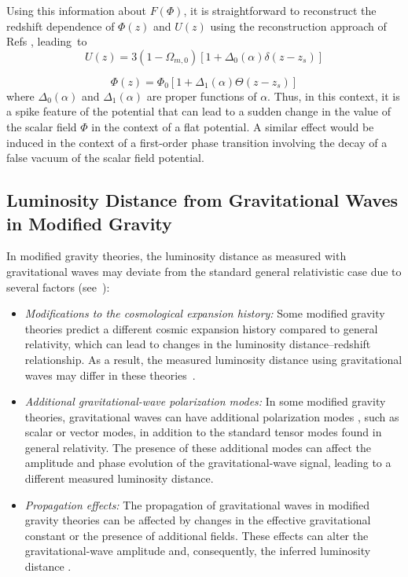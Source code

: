 \documentclass[universe,article,accept,moreauthors,pdftex]{Definitions/mdpi}
\begin{document}
Using this information about $F(\Phi)$, it is straightforward to reconstruct the redshift dependence of $\Phi(z)$ and $U(z)$ using the reconstruction approach of Refs \cite{Esposito-Farese:2000pbo,Boisseau:2000pr,Perivolaropoulos:2005yv}, leading~to 
\begin{equation}\label{equat2}
U(z)=3(1-\Omega_{m,0})[1+\Delta_{0}(\alpha)\delta(z-z_s)]
\end{equation}

\begin{equation}\label{equat4}
\Phi(z)=\Phi_{0}[1+\Delta_{1}(\alpha) \Theta(z-z_{s})]
\end{equation}
where $\Delta_{0}(\alpha)$ and $\Delta_{1}(\alpha)$ are proper functions of $\alpha$. Thus, in this context, it is a spike feature of the potential that can lead to a sudden change in the value of the scalar field $\Phi$ in the context of a flat potential. A similar effect would be induced in the context of a first-order phase transition involving the decay of a false vacuum of the scalar field potential.

\subsection{Luminosity Distance from Gravitational Waves in Modified Gravity}


In modified gravity theories, the luminosity distance as measured with gravitational waves may deviate from the standard general relativistic case due to several factors (\mbox{see \cite{Nishizawa_2018,Arai:2017hxj}):}

\begin{itemize}
\item \textit{Modifications to the cosmological expansion history:} Some modified gravity theories predict a different cosmic expansion history compared to general relativity, which can lead to changes in the luminosity distance--redshift relationship. As a result, the measured luminosity distance using gravitational waves may differ in these \mbox{theories \cite{Linder_2018}.}

\item \textit{Additional gravitational-wave polarization modes:} In some modified gravity theories, gravitational waves can have additional polarization modes \cite{Eardley:1973zuo}, such as scalar or vector modes, in addition to the standard tensor modes found in general relativity. The presence of these additional modes can affect the amplitude and phase evolution of the gravitational-wave signal, leading to a different measured luminosity distance.

\item \textit{Propagation effects:} The propagation of gravitational waves in modified gravity theories can be affected by changes in the effective gravitational constant or the presence of additional fields. These effects can alter the gravitational-wave amplitude and, consequently, the inferred luminosity distance \cite{Belgacem:2017ihm,Nishizawa_2018}.
\end{itemize}
\end{document}
